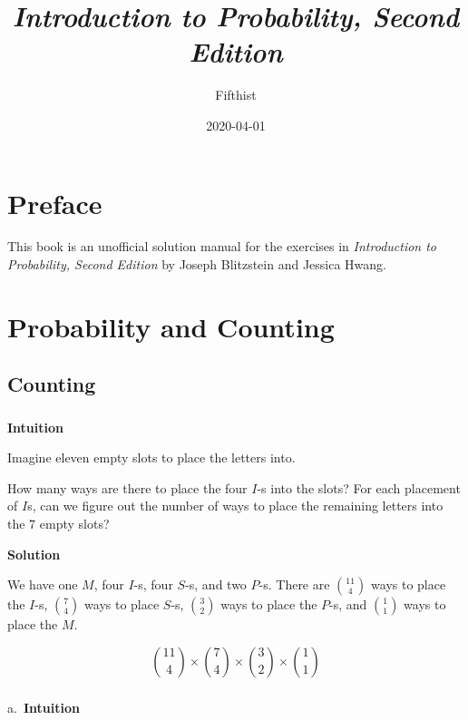 \documentclass[]{book}
\title{\emph{Introduction to Probability, Second Edition}}
\author{Fifthist}
\date{2020-04-01}
\begin{document}
\maketitle

{
\setcounter{tocdepth}{1}
\tableofcontents
}
\chapter*{Preface}\label{preface}

This book is an unofficial solution manual for the exercises in
\emph{Introduction to Probability, Second Edition} by Joseph Blitzstein
and Jessica Hwang.

\chapter{Probability and Counting}\label{probability-and-counting}

\section{Counting}\label{counting}

\subsection{}\label{section}

\textbf{Intuition}

Imagine eleven empty slots to place the letters into.

How many ways are there to place the four \(I\)-s into the slots? For
each placement of \(I\)s, can we figure out the number of ways to place
the remaining letters into the \(7\) empty slots?

 \textbf{Solution}

We have one \(M\), four \(I\)-s, four \(S\)-s, and two \(P\)-s. There
are \({11 \choose 4}\) ways to place the \(I\)-s, \({7 \choose 4}\) ways
to place \(S\)-s, \({3 \choose 2}\) ways to place the \(P\)-s, and
\({1 \choose 1}\) ways to place the \(M\).

\[ {11 \choose 4} \times {7 \choose 4} \times {3 \choose 2} \times {1 \choose 1} \]

\subsection{}\label{section-1}

a.~\textbf{Intuition}
\end{document}

